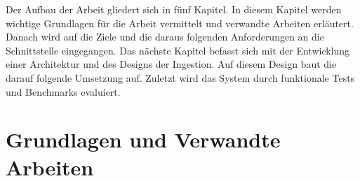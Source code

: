 Der Aufbau der Arbeit gliedert sich in fünf Kapitel.
In diesem Kapitel werden wichtige Grundlagen für die Arbeit vermittelt und verwandte Arbeiten erläutert.
Danach wird auf die Ziele und die daraus folgenden Anforderungen an die Schnittstelle eingegangen.
Das nächste Kapitel befasst sich mit der Entwicklung einer Architektur und des Designs der Ingestion.
Auf diesem Design baut die darauf folgende Umsetzung auf.
Zuletzt wird das System durch funktionale Tests und Benchmarks evaluiert.

\section{Grundlagen und Verwandte Arbeiten}









% 

